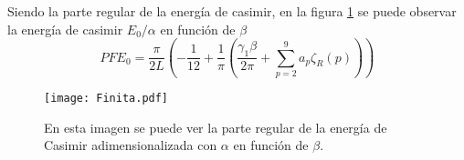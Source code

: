 Siendo la parte regular de la energía de casimir, en la figura \ref{fig.finita} se puede observar la energía de casimir $E _0 / \alpha$ en función de $\beta$
\begin{equation}
PF E_0 = 
\frac{\pi}{2 L }
					\left(
							- \frac{1}{12} +
							\frac{1}{\pi } \left(
											\frac{\gamma _1 \beta}{2 \pi} + 
											\sum _{p=2} ^{9} a _p \zeta _R (p)
												\right)
							\right) 
\end{equation}



\begin{figure}
\centering
\texttt{[image: Finita.pdf]}
\caption{En esta imagen se puede ver la parte regular de la energía de Casimir adimensionalizada con $\alpha$ en función de $\beta$. }
\label{fig.finita}
\end{figure}





